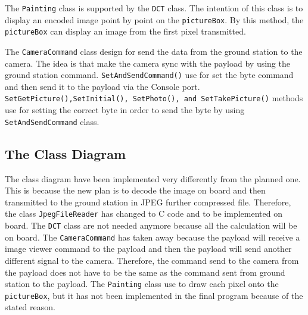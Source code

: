The \texttt{Painting} class is supported by the \texttt{DCT} class. The intention of this class is to display an encoded image point by point on the \texttt{pictureBox}.
By this method, the \texttt{pictureBox} can display an image from the first pixel transmitted.

The \texttt{CameraCommand} class design for send the data from the ground station to the camera. The idea is that make the camera sync with the payload by using the ground station command. \texttt{SetAndSendCommand()} use for set the byte command and then send it to the payload via the Console port. \texttt{SetGetPicture(),SetInitial(), SetPhoto(), and SetTakePicture()} methods use for setting the correct byte in order to send the byte by using \texttt{SetAndSendCommand} class.

\subsection*{The Class Diagram}
The class diagram have been implemented very differently from the planned one.
This is because the new plan is to decode the image on board and then transmitted to the ground station in JPEG further compressed file. 
Therefore, the class \texttt{JpegFileReader} has changed to C code and to be implemented on board. 
The \texttt{DCT} class are not needed anymore because all the calculation will be on board. 
The \texttt{CameraCommand} has taken away because the payload will receive a image viewer command to the payload and then the payload will send another different signal to the camera.
Therefore, the command send to the camera from the payload does not have to be the same as the command sent from ground station to the payload. 
The \texttt{Painting} class use to draw each pixel onto the \texttt{pictureBox}, but it has not been implemented in the final program because of the stated reason.
 
